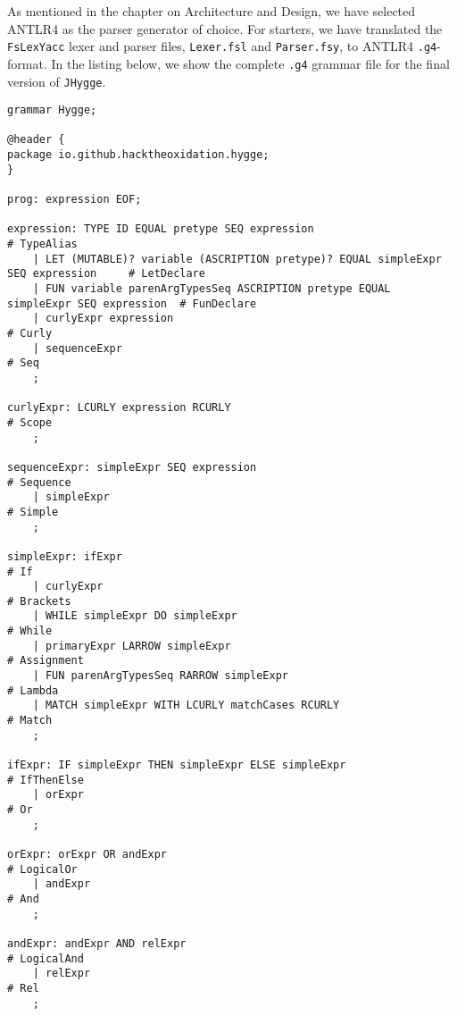 As mentioned in the chapter on Architecture and Design, we have selected ANTLR4 as the parser generator of choice. For starters,
we have translated the \texttt{FsLexYacc} lexer and parser files, \texttt{Lexer.fsl} and \texttt{Parser.fsy}, to ANTLR4
\texttt{.g4}-format. In the listing below, we show the complete \texttt{.g4} grammar file for the final version of \texttt{JHygge}.

\begin{lstlisting}
grammar Hygge;

@header {
package io.github.hacktheoxidation.hygge;
}

prog: expression EOF;

expression: TYPE ID EQUAL pretype SEQ expression                                        # TypeAlias
    | LET (MUTABLE)? variable (ASCRIPTION pretype)? EQUAL simpleExpr SEQ expression     # LetDeclare
    | FUN variable parenArgTypesSeq ASCRIPTION pretype EQUAL simpleExpr SEQ expression  # FunDeclare
    | curlyExpr expression                                                              # Curly
    | sequenceExpr                                                                      # Seq
    ;

curlyExpr: LCURLY expression RCURLY                                       # Scope
    ;

sequenceExpr: simpleExpr SEQ expression                                   # Sequence
    | simpleExpr                                                          # Simple
    ;

simpleExpr: ifExpr                                                        # If
    | curlyExpr                                                           # Brackets
    | WHILE simpleExpr DO simpleExpr                                      # While
    | primaryExpr LARROW simpleExpr                                       # Assignment
    | FUN parenArgTypesSeq RARROW simpleExpr                              # Lambda
    | MATCH simpleExpr WITH LCURLY matchCases RCURLY                      # Match
    ;

ifExpr: IF simpleExpr THEN simpleExpr ELSE simpleExpr                     # IfThenElse
    | orExpr                                                              # Or
    ;

orExpr: orExpr OR andExpr                                                 # LogicalOr
    | andExpr                                                             # And
    ;

andExpr: andExpr AND relExpr                                              # LogicalAnd
    | relExpr                                                             # Rel
    ;


\end{lstlisting}
